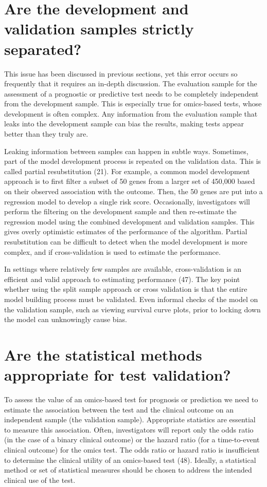 \documentclass[11pt]{article}
\begin{document}
\section{Are the development and validation samples strictly
separated?}\label{are-the-development-and-validation-samples-strictly-separated}

This issue has been discussed in previous sections, yet this error
occurs so frequently that it requires an in-depth discussion. The
evaluation sample for the assessment of a prognostic or predictive test
needs to be completely independent from the development sample. This is
especially true for omics-based tests, whose development is often
complex. Any information from the evaluation sample that leaks into the
development sample can bias the results, making tests appear better than
they truly are.

Leaking information between samples can happen in subtle ways.
Sometimes, part of the model development process is repeated on the
validation data. This is called partial resubstitution (21). For
example, a common model development approach is to first filter a subset
of 50 genes from a larger set of 450,000 based on their observed
association with the outcome. Then, the 50 genes are put into a
regression model to develop a single risk score. Occasionally,
investigators will perform the filtering on the development sample and
then re-estimate the regression model using the combined development and
validation samples. This gives overly optimistic estimates of the
performance of the algorithm. Partial resubstitution can be difficult to
detect when the model development is more complex, and if
cross-validation is used to estimate the performance.

In settings where relatively few samples are available, cross-validation
is an efficient and valid approach to estimating performance (47). The
key point whether using the split sample approach or cross validation is
that the entire model building process must be validated. Even informal
checks of the model on the validation sample, such as viewing survival
curve plots, prior to locking down the model can unknowingly cause bias.

\section{Are the statistical methods appropriate for test
validation?}\label{are-the-statistical-methods-appropriate-for-test-validation}

To assess the value of an omics-based test for prognosis or prediction
we need to estimate the association between the test and the clinical
outcome on an independent sample (the validation sample). Appropriate
statistics are essential to measure this association. Often,
investigators will report only the odds ratio (in the case of a binary
clinical outcome) or the hazard ratio (for a time-to-event clinical
outcome) for the omics test. The odds ratio or hazard ratio is
insufficient to determine the clinical utility of an omics-based test
(48). Ideally, a statistical method or set of statistical measures
should be chosen to address the intended clinical use of the test.
\end{document}
